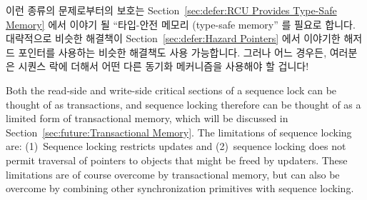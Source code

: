 {\begin{enumerate}

	\end{enumerate}

	이런 종류의 문제로부터의 보호는
	Section~\ref{sec:defer:RCU Provides Type-Safe Memory}
	에서 이야기 될 ``타입-안전 메모리 (type-safe memory'' 를 필요로 합니다.
	대략적으로 비슷한 해결책이
	Section~\ref{sec:defer:Hazard Pointers}
	에서 이야기한 해저드 포인터를 사용하는 비슷한 해결책도 사용 가능합니다.
	그러나 어느 경우든, 여러분은 시퀀스 락에 더해서 어떤 다른 동기화
	메커니즘을 사용해야 할 겁니다!

}\QuickQuizEnd

Both the read-side and write-side critical sections of a sequence lock
can be thought of as transactions, and sequence locking therefore
can be thought of as a limited form of transactional memory, which
will be discussed in Section~\ref{sec:future:Transactional Memory}.
The limitations of sequence locking are: (1)~Sequence locking restricts
updates and (2)~sequence locking does not permit traversal of pointers
to objects that might be freed by updaters.
These limitations are of course overcome by transactional memory, but
can also be overcome by combining other synchronization primitives
with sequence locking.

